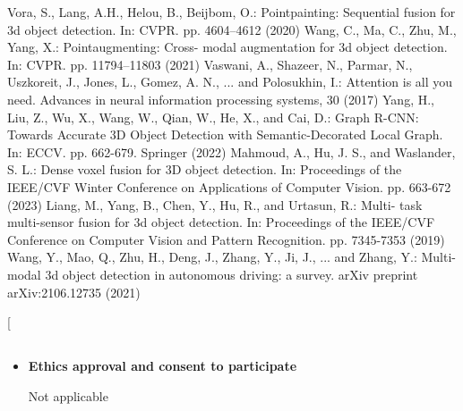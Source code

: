 \begin{sloppypar}
\begin{thebibliography}{33}
        Vora, S., Lang, A.H., Helou, B., Beijbom, O.: Pointpainting: 
    Sequential fusion for 3d object detection. In: CVPR. pp. 4604–4612 (2020)
        Wang, C., Ma, C., Zhu, M., Yang, X.: Pointaugmenting: Cross-
    modal augmentation for 3d object detection. In: CVPR. pp. 11794–11803 (2021)
        Vaswani, A., Shazeer, N., Parmar, N., Uszkoreit, J., Jones, 
    L., Gomez, A. N., ... and Polosukhin, I.: Attention is all you need. Advances in neural information processing systems, 30 (2017)
        Yang, H., Liu, Z., Wu, X., Wang, W., Qian, W., He, X., and 
    Cai, D.: Graph R-CNN: Towards Accurate 3D Object Detection with Semantic-Decorated Local Graph. In: ECCV. pp. 662-679. Springer (2022)
        Mahmoud, A., Hu, J. S., and Waslander, S. L.: Dense voxel 
    fusion for 3D object detection. In: Proceedings of the IEEE/CVF Winter Conference on Applications of Computer Vision. pp. 663-672 (2023)
        Liang, M., Yang, B., Chen, Y., Hu, R., and Urtasun, R.: Multi-
    task multi-sensor fusion for 3d object detection. In: Proceedings of the IEEE/CVF Conference on Computer Vision and Pattern Recognition. pp. 7345-7353 (2019)
        Wang, Y., Mao, Q., Zhu, H., Deng, J., Zhang, Y., Ji, J., ... and Zhang, Y.: Multi-modal 3d object detection in autonomous driving: a survey. arXiv preprint arXiv:2106.12735 (2021)

       
    
\end{thebibliography}

\def\bibfont{\fontsize{10.5}\selectfont}
% 

\twocolumn[
\begin{@twocolumnfalse}
\section*{}

\renewcommand{\labelitemi}{\textbullet}


\begin{itemize}

\setlength{\itemsep}{5pt}

\setlength{\parsep}{5pt}

\setlength{\parskip}{5pt}
\large \item \textbf{Ethics approval and consent to participate}

Not applicable


\end{itemize}
\end{@twocolumnfalse}
\end{sloppypar}
